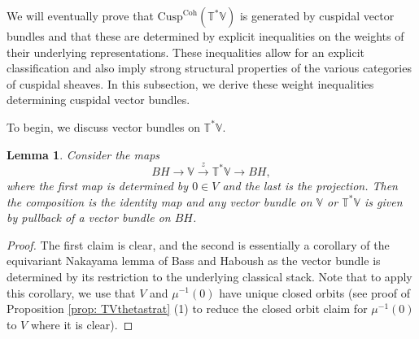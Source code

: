\documentclass{amsart}
\newtheorem{lemma}[theorem]{Lemma}
\theoremstyle{definition}
\theoremstyle{remark}
\numberwithin{equation}{section}
\newcommand{\Coh}{\mathrm{Coh}}
\newcommand{\Cusp}{\mathrm{Cusp}}
\newcommand{\V}{\mathbb{V}}
\newcommand{\T}{\mathbb{T}}
\begin{document}
We will eventually prove that $\Cusp^{\Coh}(\T^{\ast}\V)$ is generated by cuspidal vector bundles and that these are determined by explicit inequalities on the weights of their underlying representations. These inequalities allow for an explicit classification and also imply strong structural properties of the various categories of cuspidal sheaves. In this subsection, we derive these weight inequalities determining cuspidal vector bundles.

To begin, we discuss vector bundles on $\T^{\ast}\V$.
\begin{lemma}{\label{lem: equivnakayama}}
Consider the maps
\begin{equation*}
   BH \rightarrow \V \xrightarrow{z}  \T^{\ast}\V \rightarrow BH,
\end{equation*}
where the first map is determined by $0\in V$ and the last is the projection. Then the composition is the identity map and any vector bundle on $\V$ or $\T^{\ast}\V$ is given by pullback of a vector bundle on $BH$.
\end{lemma}
\begin{proof}
The first claim is clear, and the second is essentially a corollary of the equivariant Nakayama lemma of Bass and Haboush \cite[Corollary (6.4)]{BassHaboush} as the vector bundle is determined by its restriction to the underlying classical stack. Note that to apply this corollary, we use that $V$ and $\mu^{-1}(0)$ have unique closed orbits (see proof of Proposition \ref{prop: TVthetastrat} (1) to reduce the closed orbit claim for $\mu^{-1}(0)$ to $V$ where it is clear). 
\end{proof}
\end{document}
